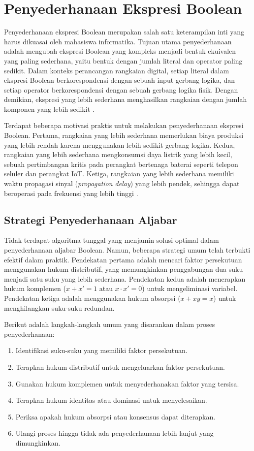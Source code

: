 \section{Penyederhanaan Ekspresi Boolean}

Penyederhanaan ekspresi Boolean merupakan salah satu keterampilan inti yang harus dikuasai oleh mahasiswa informatika. Tujuan utama penyederhanaan adalah mengubah ekspresi Boolean yang kompleks menjadi bentuk ekuivalen yang paling sederhana, yaitu bentuk dengan jumlah literal dan operator paling sedikit. Dalam konteks perancangan rangkaian digital, setiap literal dalam ekspresi Boolean berkorespondensi dengan sebuah input gerbang logika, dan setiap operator berkorespondensi dengan sebuah gerbang logika fisik. Dengan demikian, ekspresi yang lebih sederhana menghasilkan rangkaian dengan jumlah komponen yang lebih sedikit \cite{rosen2019}.

Terdapat beberapa motivasi praktis untuk melakukan penyederhanaan ekspresi Boolean. Pertama, rangkaian yang lebih sederhana memerlukan biaya produksi yang lebih rendah karena menggunakan lebih sedikit gerbang logika. Kedua, rangkaian yang lebih sederhana mengkonsumsi daya listrik yang lebih kecil, sebuah pertimbangan kritis pada perangkat bertenaga baterai seperti telepon seluler dan perangkat IoT. Ketiga, rangkaian yang lebih sederhana memiliki waktu propagasi sinyal (\textit{propagation delay}) yang lebih pendek, sehingga dapat beroperasi pada frekuensi yang lebih tinggi \cite{allaboutcircuits_boolean}.

\subsection{Strategi Penyederhanaan Aljabar}

Tidak terdapat algoritma tunggal yang menjamin solusi optimal dalam penyederhanaan aljabar Boolean. Namun, beberapa strategi umum telah terbukti efektif dalam praktik. Pendekatan pertama adalah mencari faktor persekutuan menggunakan hukum distributif, yang memungkinkan penggabungan dua suku menjadi satu suku yang lebih sederhana. Pendekatan kedua adalah menerapkan hukum komplemen ($x + x' = 1$ atau $x \cdot x' = 0$) untuk mengeliminasi variabel. Pendekatan ketiga adalah menggunakan hukum absorpsi ($x + xy = x$) untuk menghilangkan suku-suku redundan.

Berikut adalah langkah-langkah umum yang disarankan dalam proses penyederhanaan:

\begin{enumerate}
  \item Identifikasi suku-suku yang memiliki faktor persekutuan.
  \item Terapkan hukum distributif untuk mengeluarkan faktor persekutuan.
  \item Gunakan hukum komplemen untuk menyederhanakan faktor yang tersisa.
  \item Terapkan hukum identitas atau dominasi untuk menyelesaikan.
  \item Periksa apakah hukum absorpsi atau konsensus dapat diterapkan.
  \item Ulangi proses hingga tidak ada penyederhanaan lebih lanjut yang dimungkinkan.
\end{enumerate}

